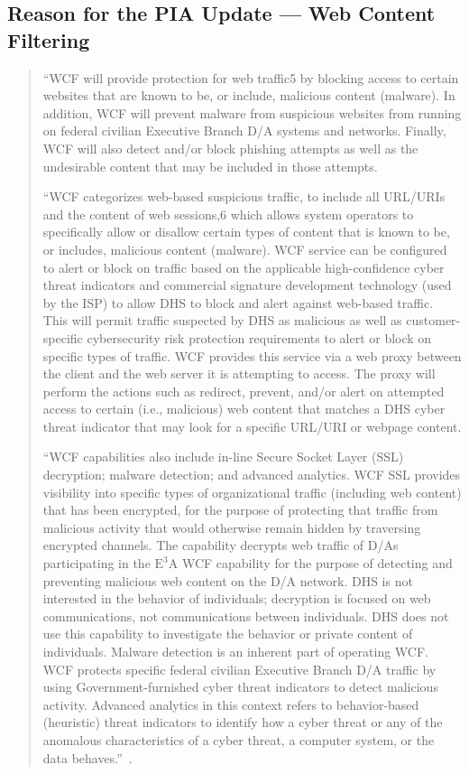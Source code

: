 \documentclass[fleqn,12pt]{wlscirep}
\newcommand{\ETA}{$\textrm{E}^\textrm{3}\textrm{A}$\xspace}
\begin{document}
\subsection{Reason for the PIA Update --- Web Content Filtering}\label{excerpt4}
\begin{quote}
``WCF will provide protection for web traffic5
by blocking
access to certain websites that are known to be, or include, malicious content (malware). In
addition, WCF will prevent malware from suspicious websites from running on federal civilian
Executive Branch D/A systems and networks. Finally, WCF will also detect and/or block phishing
attempts as well as the undesirable content that may be included in
those attempts.

``WCF categorizes web-based suspicious traffic, to include all URL/URIs and the content of web sessions,6 which allows system operators to specifically allow or disallow certain types of content that is known to be, or includes, malicious content (malware). WCF service can be configured to alert or block on traffic based on the applicable high-confidence cyber threat indicators and commercial signature development technology (used by the ISP) to allow DHS to block and alert against web-based traffic. This will permit traffic suspected by DHS as malicious as well as customer-specific cybersecurity risk protection requirements to alert or block on specific types of traffic. WCF provides this service via a web proxy between the client and the web server it is attempting to access. The proxy will perform the actions such as redirect, prevent, and/or alert on attempted access to certain (i.e., malicious) web content that matches a DHS cyber threat indicator that may look for a specific URL/URI or webpage content.

``WCF capabilities also include in-line Secure Socket Layer (SSL)
decryption; malware detection; and advanced analytics. WCF SSL
provides visibility into specific types of organizational traffic
(including web content) that has been encrypted, for the purpose of
protecting that traffic from malicious activity that would otherwise
remain hidden by traversing encrypted channels. The capability
decrypts web traffic of D/As participating in the \ETA WCF capability
for the purpose of detecting and preventing malicious web content on
the D/A network.  DHS is not interested in the behavior of
individuals; decryption is focused on web communications, not
communications between individuals. DHS does not use this capability
to investigate the behavior or private content of individuals. Malware
detection is an inherent part of operating WCF. WCF protects specific
federal civilian Executive Branch D/A traffic by using
Government-furnished cyber threat indicators to detect malicious
activity. Advanced analytics in this context refers to behavior-based
(heuristic) threat indicators to identify how a cyber threat or any of
the anomalous characteristics of a cyber threat, a computer system, or
the data behaves.''~\cite[pp 2--3]{dhs-e3a-pia2}.
\end{quote}
\end{document}
